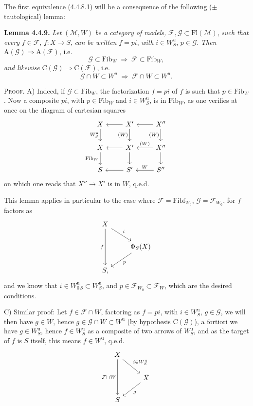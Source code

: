 \documentclass[11pt]{article}
\newcommand{\printedpage}[1]{\marginpar{\footnotesize p.~#1}}
\newcommand{\msp}[1]{\marginpar{\footnotesize [#1]}}
\newcommand{\Fib}{\mathrm{Fib}}
\newcommand{\Fibf}{\mathrm{Fibf}}
\newcommand{\Fl}{\mathrm{Fl}}
\begin{document}
The first equivalence (4.4.8.1) will be a consequence of the following ($\pm$ tautological) lemma:

\textbf{Lemma 4.4.9.} \textit{Let} $(\mathcal{M}, W)$ \textit{be a category of models,} $\mathcal{F}, \mathcal{G} \subset \Fl(\mathcal{M})$, \textit{such that every} $f \in \mathcal{F}$, $f : X \longrightarrow S$, \textit{can be written} $f = pi$, \textit{with} $i \in W^u_S$, $p \in \mathcal{G}$. \textit{Then} $\mathrm{A}(\mathcal{G}) \Longrightarrow \mathrm{A}(\mathcal{F})$, i.e.
\[
\mathcal{G} \subset \Fib_W \;\Longrightarrow\; \mathcal{F} \subset \Fib_W,
\tag*{(4.4.9.1)}
\]
\textit{and likewise} $\mathrm{C}(\mathcal{G}) \Longrightarrow \mathrm{C}(\mathcal{F})$, i.e.
\[
\mathcal{G} \cap W \subset W^u \;\Longrightarrow\; \mathcal{F} \cap W \subset W^u.
\tag*{(4.4.9.2)}
\]

\textsc{Proof}. A) Indeed, if $\mathcal{G} \subset \Fib_W$, the factorization $f = pi$ of $f$ is such that $p \in \Fib_W$. Now a composite $pi$, with $p \in \Fib_W$ and $i \in W^{\mathrm{u}}_S$, is in $\Fib_W$, as one verifies at once on the diagram of cartesian squares
\printedpage{30}
\[
\begin{tikzcd}
X \arrow[d, "W^{\mathrm{u}}_S"'] & X' \arrow[l] \arrow[d, "(W)"'] & X'' \arrow[l] \arrow[d, "(W)"'] \\
\overline{X} \arrow[d, "\Fib_W"'] & \overline{X'} \arrow[l] \arrow[d] & \overline{X''} \arrow[l, "(W)"'] \arrow[d] \\
S & S' \arrow[l] & S'' \arrow[l, "W"']
\end{tikzcd}
\]
on which one reads that $X'' \longrightarrow X'$ is in $W$, q.e.d.

\msp{page 52}
This lemma applies in particular to the case where $\mathcal{F} = \Fibf_{W_0}$, $\mathcal{G} = \mathcal{F}_{W_0}$, for $f$ factors as
\[
\begin{tikzcd}
X \arrow[dr, "i"] \arrow[dd, "f"'] & \\
& \Phi_S(X) \arrow[dl, "p"] \\
S, &
\end{tikzcd}
\]
and we know that $i \in W^{\mathrm{u}}_{0\,S} \subset W^{\mathrm{u}}_S$, and $p \in \mathcal{F}_{W_0} \subset \mathcal{F}_W$, which are the desired conditions.

C) Similar proof: Let $f \in \mathcal{F} \cap W$, factoring as $f = pi$, with $i \in W^{\mathrm{u}}_S$, $g \in \mathcal{G}$, we will then have $g \in W$, hence $g \in \mathcal{G} \cap W \subset W^{\mathrm{u}}$ (by hypothesis $\mathrm{C}(\mathcal{G})$), a fortiori we have $g \in W^{\mathrm{u}}_S$, hence $f \in W^{\mathrm{u}}_S$ as a composite of two arrows of $W^{\mathrm{u}}_S$, and as the target of $f$ is $S$ itself, this means $f \in W^{\mathrm{u}}$, q.e.d.
\[
\begin{tikzcd}
X \arrow[dr, "i\in W^{\mathrm{u}}_S"] \arrow[dd, "\mathcal{F}\cap W"'] & \\
& \bar{X} \arrow[dl, "g"] \\
S &
\end{tikzcd}
\]
\end{document}
